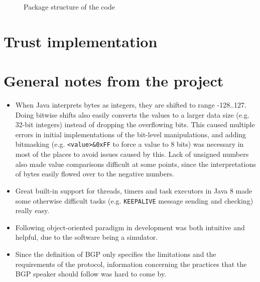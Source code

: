 \documentclass[10pt,a4paper,titlepage]{report}
\begin{document}
\begin{figure}
\caption{Package structure of the code}
\label{fig:packagestructure}
\end{figure}


\section{Trust implementation}\label{sec:trust}

\section{General notes from the project}\label{sec:notes}
\begin{itemize}
\item When Java interprets bytes as integers, they are shifted to range -128..127. Doing bitwise shifts also easily converts the values to a larger data size (e.g. 32-bit integers) instead of dropping the overflowing bits. This caused multiple errors in initial implementations of the bit-level manipulations, and adding bitmasking (e.g. \texttt{<value>\&0xFF} to force a value to 8 bits) was necessary in most of the places to avoid issues caused by this. Lack of unsigned numbers also made value comparisons difficult at some points, since the interpretations of bytes easily flowed over to the negative numbers.
\item Great built-in support for threads, timers and task executors in Java 8 made some otherwise difficult tasks (e.g. \texttt{KEEPALIVE} message sending and checking) really easy.
\item Following object-oriented paradigm in development was both intuitive and helpful, due to the software being a simulator.
\item Since the definition of BGP \cite{RFC4271} only specifies the limitations and the requirements of the protocol, information concerning the practices that the BGP speaker should follow was hard to come by.
\end{itemize}



\end{document}
